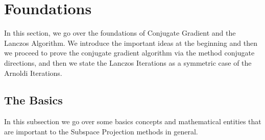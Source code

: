 \documentclass[]{article}
\theoremstyle{definition}
\begin{document}
\newpage
\section{Foundations}
    In this section, we go over the foundations of Conjugate Gradient and the Lanczos Algorithm. We introduce the important ideas at the beginning and then we proceed to prove the conjugate gradient algorithm via the method conjugate directions, and then we state the Lanczos Iterations as a symmetric case of the Arnoldi Iterations. 
    \subsection{The Basics}
        In this subsection we go over some basics concepts and mathematical entities that are important to the Subspace Projection methods in general. 
\end{document}
